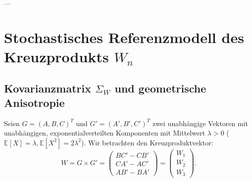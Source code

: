 \documentclass[11pt,a4paper]{article}
\theoremstyle{plain}
\theoremstyle{definition}
\theoremstyle{remark}
\begin{document}
---

\section{Stochastisches Referenzmodell des Kreuzprodukts $W_n$}

\subsection{Kovarianzmatrix $\Sigma_W$ und geometrische Anisotropie}

Seien $G = (A,B,C)^T$ und $G' = (A',B',C')^T$ zwei unabhängige Vektoren mit unabhängigen, exponentialverteilten Komponenten mit Mittelwert $\lambda > 0$ ($\mathbb{E}[X] = \lambda, \mathbb{E}[X^2] = 2\lambda^2$). Wir betrachten den Kreuzproduktvektor:
\begin{equation}
W = G \times G' = \begin{pmatrix} B C' - C B' \\ C A' - A C' \\ A B' - B A' \end{pmatrix} = \begin{pmatrix} W_1 \\ W_2 \\ W_3 \end{pmatrix}.
\end{equation}
\end{document}
